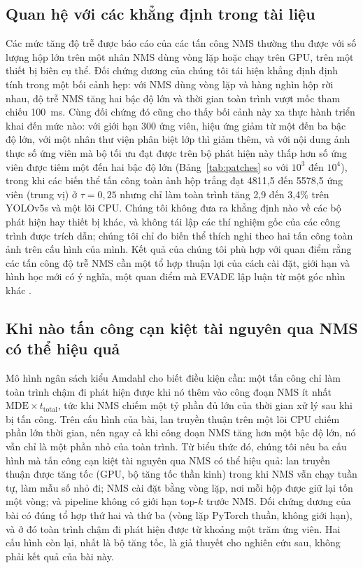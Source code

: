 \documentclass[12pt,a4paper]{article}
\begin{document}
\subsection{Quan hệ với các khẳng định trong tài liệu}
Các mức tăng độ trễ được báo cáo của các tấn công NMS thường thu được với số lượng hộp lớn trên một nhân NMS dùng vòng lặp hoặc chạy trên GPU, trên một thiết bị biên cụ thể. Đối chứng dương của chúng tôi tái hiện khẳng định định tính trong một bối cảnh hẹp: với NMS dùng vòng lặp và hàng nghìn hộp rời nhau, độ trễ NMS tăng hai bậc độ lớn và thời gian toàn trình vượt mốc tham chiếu 100~ms. Cùng đối chứng đó cũng cho thấy bối cảnh này xa thực hành triển khai đến mức nào: với giới hạn 300 ứng viên, hiệu ứng giảm từ một đến ba bậc độ lớn, với một nhân thư viện phân biệt lớp thì giảm thêm, và với nội dung ảnh thực số ứng viên mà bộ tối ưu đạt được trên bộ phát hiện này thấp hơn số ứng viên được tiêm một đến hai bậc độ lớn (Bảng~\ref{tab:patches} so với $10^3$ đến $10^4$), trong khi các biến thể tấn công toàn ảnh hộp trắng đạt 4811,5 đến 5578,5 ứng viên (trung vị) ở $\tau=0{,}25$ nhưng chỉ làm toàn trình tăng 2,9 đến 3,4\% trên YOLOv5s và một lõi CPU. Chúng tôi không đưa ra khẳng định nào về các bộ phát hiện hay thiết bị khác, và không tái lập các thí nghiệm gốc của các công trình được trích dẫn; chúng tôi chỉ đo biến thể thích nghi theo hai tấn công toàn ảnh trên cấu hình của mình. Kết quả của chúng tôi phù hợp với quan điểm rằng các tấn công độ trễ NMS cần một tổ hợp thuận lợi của cách cài đặt, giới hạn và hình học mới có ý nghĩa, một quan điểm mà EVADE lập luận từ một góc nhìn khác \cite{evade2025}.

\subsection{Khi nào tấn công cạn kiệt tài nguyên qua NMS có thể hiệu quả}
Mô hình ngân sách kiểu Amdahl cho biết điều kiện cần: một tấn công chỉ làm toàn trình chậm đi phát hiện được khi nó thêm vào công đoạn NMS ít nhất $\mathrm{MDE}\times t_{\mathrm{total}}$, tức khi NMS chiếm một tỷ phần đủ lớn của thời gian xử lý sau khi bị tấn công. Trên cấu hình của bài, lan truyền thuận trên một lõi CPU chiếm phần lớn thời gian, nên ngay cả khi công đoạn NMS tăng hơn một bậc độ lớn, nó vẫn chỉ là một phần nhỏ của toàn trình. Từ biểu thức đó, chúng tôi nêu ba cấu hình mà tấn công cạn kiệt tài nguyên qua NMS có thể hiệu quả: lan truyền thuận được tăng tốc (GPU, bộ tăng tốc thần kinh) trong khi NMS vẫn chạy tuần tự, làm mẫu số nhỏ đi; NMS cài đặt bằng vòng lặp, nơi mỗi hộp được giữ lại tốn một vòng; và pipeline không có giới hạn top-$k$ trước NMS. Đối chứng dương của bài có đúng tổ hợp thứ hai và thứ ba (vòng lặp PyTorch thuần, không giới hạn), và ở đó toàn trình chậm đi phát hiện được từ khoảng một trăm ứng viên. Hai cấu hình còn lại, nhất là bộ tăng tốc, là giả thuyết cho nghiên cứu sau, không phải kết quả của bài này.
\end{document}
